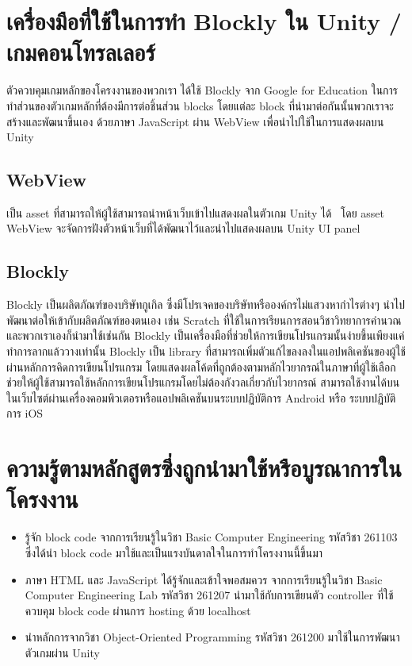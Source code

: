 \section{เครื่องมือที่ใช้ในการทำ Blockly ใน Unity / เกมคอนโทรลเลอร์}
ตัวควบคุมเกมหลักของโครงงานของพวกเรา ได้ใช้ Blockly 
จาก Google for Education ในการทำส่วนของตัวเกมหลักที่ต้องมีการต่อชิ้นส่วน 
blocks โดยแต่ละ block ที่นำมาต่อกันนั้นพวกเราจะสร้างและพัฒนาขึ้นเอง ด้วยภาษา 
JavaScript ผ่าน WebView เพื่อนำไปใช้ในการแสดงผลบน Unity

\subsection{WebView}
เป็น asset ที่สามารถให้ผู้ใช้สามารถนำหน้าเว็บเข้าไปแสดงผลในตัวเกม Unity ได้~\cite{unw} โดย asset WebView จะจัดการฝังตัวหน้าเว็บที่ได้พัฒนาไว้และนำไปแสดงผลบน Unity UI panel

\subsection{Blockly}
Blockly เป็นผลิตภัณฑ์ของบริษัทกูเกิล ซึ่งมีโปรเจคของบริษัทหรือองค์กรไม่แสวงหากำไรต่างๆ นำไปพัฒนาต่อให้เข้ากับผลิตภัณฑ์ของตนเอง เช่น Scratch ที่ใช้ในการเรียนการสอนวิชาวิทยาการคำนวณ
และพวกเราเองก็นำมาใช้เช่นกัน Blockly 
เป็นเครื่องมือที่ช่วยให้การเขียนโปรแกรมนั้นง่ายขึ้นเพียงแค่ทำการลากแล้ววางเท่านั้น
Blockly เป็น library ที่สามารถเพิ่มตัวแก้ไขลงลงในแอปพลิเคชันของผู้ใช้ผ่านหลักการคิดการเขียนโปรแกรม
โดยแสดงผลโค้ดที่ถูกต้องตามหลักไวยากรณ์ในภาษาที่ผู้ใช้เลือก 
ช่วยให้ผู้ใช้สามารถใช้หลักการเขียนโปรแกรมโดยไม่ต้องกังวลเกี่ยวกับไวยากรณ์ 
สามารถใช้งานได้บนในเว็บไซต์ผ่านเครื่องคอมพิวเตอรหรือแอปพลิเคชันบนระบบปฏิบัติการ Android หรือ ระบบปฏิบัติการ iOS~\cite{blc}


\section{ความรู้ตามหลักสูตรซึ่งถูกนำมาใช้หรือบูรณาการในโครงงาน}
\begin{itemize}
  \item รู้จัก block code จากการเรียนรู้ในวิชา Basic Computer Engineering รหัสวิชา 261103 ซึ่งได้นำ block code มาใช้และเป็นแรงบันดาลใจในการทำโครงงานนี้ขึ้นมา
  \item ภาษา HTML และ JavaScript ได้รู้จักและเข้าใจพอสมควร จากการเรียนรู้ในวิชา Basic Computer Engineering Lab รหัสวิชา 261207 นำมาใช้กับการเขียนตัว controller ที่ใช้ควบคุม block code ผ่านการ hosting ด้วย localhost
  \item นำหลักการจากวิชา Object-Oriented Programming รหัสวิชา 261200 มาใช้ในการพัฒนาตัวเกมผ่าน Unity
\end{itemize}

